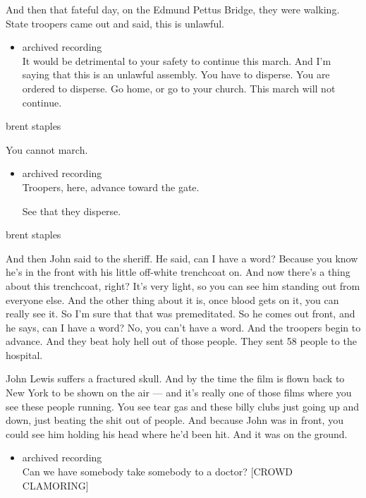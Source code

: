 And then that fateful day, on the Edmund Pettus Bridge, they were
walking. State troopers came out and said, this is unlawful.

\begin{itemize}
\tightlist
\item
  archived recording\\
  It would be detrimental to your safety to continue this march. And I'm
  saying that this is an unlawful assembly. You have to disperse. You
  are ordered to disperse. Go home, or go to your church. This march
  will not continue.
\end{itemize}

brent staples

You cannot march.

\begin{itemize}
\item
  archived recording\\
  Troopers, here, advance toward the gate.

  See that they disperse.
\end{itemize}

brent staples

And then John said to the sheriff. He said, can I have a word? Because
you know he's in the front with his little off-white trenchcoat on. And
now there's a thing about this trenchcoat, right? It's very light, so
you can see him standing out from everyone else. And the other thing
about it is, once blood gets on it, you can really see it. So I'm sure
that that was premeditated. So he comes out front, and he says, can I
have a word? No, you can't have a word. And the troopers begin to
advance. And they beat holy hell out of those people. They sent 58
people to the hospital.

John Lewis suffers a fractured skull. And by the time the film is flown
back to New York to be shown on the air --- and it's really one of those
films where you see these people running. You see tear gas and these
billy clubs just going up and down, just beating the shit out of people.
And because John was in front, you could see him holding his head where
he'd been hit. And it was on the ground.

\begin{itemize}
\tightlist
\item
  archived recording\\
  Can we have somebody take somebody to a doctor? {[}CROWD CLAMORING{]}
\end{itemize}

